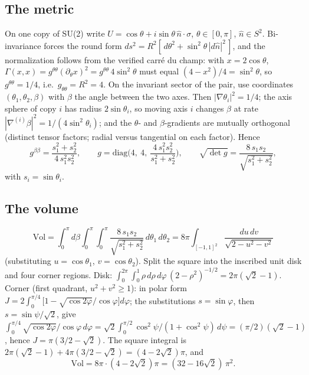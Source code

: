 \documentclass[11pt]{article}
\theoremstyle{definition}
\theoremstyle{remark}
\begin{document}
\subsection{The metric}\label{app:geometry}
On one copy of SU(2) write $U = \cos\theta + i\sin\theta\,\hat n \cdot
\sigma$, $\theta \in [0,\pi]$, $\hat n \in S^2$.  Bi-invariance forces
the round form $ds^2 = R^2[\,d\theta^2 + \sin^2\!\theta\,
|d\hat n|^2\,]$, and the normalization follows from the verified
carr\'e du champ: with $x = 2\cos\theta$,
$\Gamma(x,x) = g^{\theta\theta}(\partial_\theta x)^2 =
g^{\theta\theta}\, 4\sin^2\!\theta$ must equal $(4 - x^2)/4 =
\sin^2\!\theta$, so $g^{\theta\theta} = 1/4$, i.e.\ $g_{\theta\theta} =
R^2 = 4$.  On the invariant sector of the pair, use coordinates
$(\theta_1, \theta_2, \beta)$ with $\beta$ the angle between the two
axes.  Then $|\nabla \theta_i|^2 = 1/4$; the axis sphere of copy $i$
has radius $2\sin\theta_i$, so moving axis $i$ changes $\beta$ at rate
$|\nabla^{(i)}\beta|^2 = 1/(4\sin^2\!\theta_i)$; and the $\theta$- and
$\beta$-gradients are mutually orthogonal (distinct tensor factors;
radial versus tangential on each factor).  Hence
\[
g^{\beta\beta} = \frac{s_1^2 + s_2^2}{4\, s_1^2 s_2^2},
\qquad
g = \mathrm{diag}\!\Big(4,\ 4,\ \frac{4\, s_1^2 s_2^2}{s_1^2 +
s_2^2}\Big),
\qquad
\sqrt{\det g} = \frac{8\, s_1 s_2}{\sqrt{s_1^2 + s_2^2}},
\]
with $s_i = \sin\theta_i$.

\subsection{The volume}\label{app:volume}
\[
\mathrm{Vol} = \int_0^\pi\! d\beta \int_0^\pi\!\!\int_0^\pi
\frac{8\, s_1 s_2}{\sqrt{s_1^2 + s_2^2}}\, d\theta_1\, d\theta_2
= 8\pi \int_{[-1,1]^2} \frac{du\, dv}{\sqrt{2 - u^2 - v^2}}
\]
(substituting $u = \cos\theta_1$, $v = \cos\theta_2$).  Split the
square into the inscribed unit disk and four corner regions.  Disk:
$\int_0^{2\pi}\!\!\int_0^1 \rho\, d\rho\, d\varphi\,(2 -
\rho^2)^{-1/2} = 2\pi(\sqrt2 - 1)$.  Corner (first quadrant, $u^2 + v^2
\ge 1$): in polar form
$J = 2\int_0^{\pi/4}\big[1 - \sqrt{\cos 2\varphi}/\cos\varphi\big]
d\varphi$; the substitutions $s = \sin\varphi$, then $s =
\sin\psi/\sqrt2$, give $\int_0^{\pi/4}\sqrt{\cos2\varphi}/\cos\varphi\,
d\varphi = \sqrt2\int_0^{\pi/2}\!\cos^2\!\psi/(1+\cos^2\!\psi)\,d\psi =
(\pi/2)(\sqrt2 - 1)$, hence $J = \pi(3/2 - \sqrt2)$.  The square
integral is $2\pi(\sqrt2 - 1) + 4\pi(3/2 - \sqrt2) = (4 - 2\sqrt2)\pi$,
and
\[
\mathrm{Vol} = 8\pi \cdot (4 - 2\sqrt2)\pi = (32 - 16\sqrt2)\,\pi^2 .
\]
\end{document}
